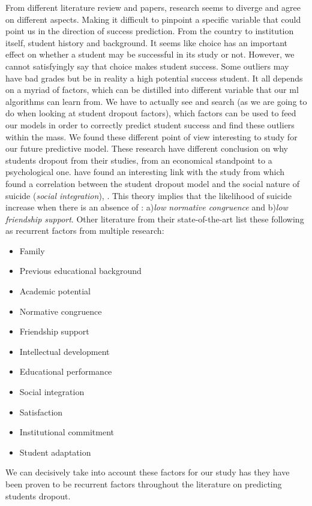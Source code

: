 \documentclass[../../main.tex]{subfiles}
\begin{document}
From different literature review and papers, research seems to diverge and agree on different aspects. Making it difficult to pinpoint a specific variable that could point us in the direction of success prediction. From the country to institution itself, student history and background. It seems like choice has an important effect on whether a student may be successful in its study or not. However, we cannot satisfyingly say that choice makes student success.  Some outliers may have bad grades but be in reality a high potential success student. It all depends on a myriad of factors, which can be distilled into different variable that our \acrfull{ml} algorithms can learn from. We have to actually see and search (as we are going to do when looking at student dropout factors), which factors can be used to feed our models in order to correctly predict student success and find these outliers within the mass.\cite{kuh_what_2006, sa_how_2018}
We found these different point of view interesting to study for our future predictive model. These research have different conclusion on why students dropout from their studies, from an economical standpoint to a psychological one.\cite{opazo_analysis_2021} have found an interesting link with the study from\cite{spady_dropouts_1970} which found a correlation between the student dropout model and the social nature of suicide (\textit{social integration}), \cite{durkheim_suicide_1951}. This theory implies that the likelihood of suicide increase when there is an absence of : a)\textit{low normative congruence} and b)\textit{low friendship support}. Other literature from their state-of-the-art list these following as recurrent factors from multiple research\cite{opazo_analysis_2021,tinto_dropout_1975,caspersen_teachers_2015,lidia_problema_2006,bejarano_caso_2017,sinchi_acceso_2018,cavero_voluntad_2011,velasco_alisis_nodate}: 
\begin{itemize}
    \item Family
    \item Previous educational background
    \item Academic potential
    \item Normative congruence
    \item Friendship support
    \item Intellectual development
    \item Educational performance
    \item Social integration
    \item Satisfaction
    \item Institutional commitment
    \item Student adaptation
\end{itemize}
We can decisively take into account these factors for our study has they have been proven to be recurrent factors throughout the literature on predicting students dropout.
\end{document}
